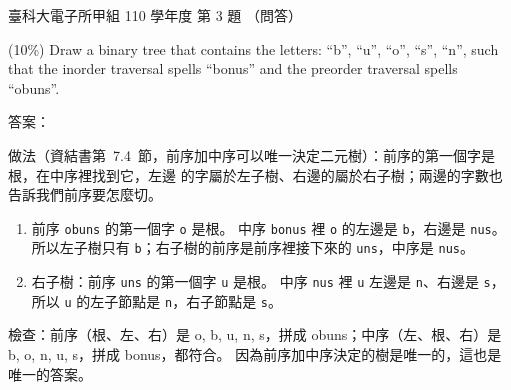 \begin{pastexam}[label={px:ntust-110-ete-ds-03}]{臺科大電子所甲組 110 學年度 第 3 題}
（問答）

(10\%) Draw a binary tree that contains the letters: ``b'', ``u'', ``o'', ``s'', ``n'', such that
the inorder traversal spells ``bonus'' and the preorder traversal spells ``obuns''.
\end{pastexam}

\begin{pastsoln}
答案：
\begin{center}
\end{center}

做法（資結書第~7.4~節，前序加中序可以唯一決定二元樹）：前序的第一個字是根，在中序裡找到它，左邊
的字屬於左子樹、右邊的屬於右子樹；兩邊的字數也告訴我們前序要怎麼切。
\begin{enumerate}
\item 前序 \texttt{obuns} 的第一個字 \texttt{o} 是根。 中序 \texttt{bonus} 裡 \texttt{o} 的左邊是
\texttt{b}，右邊是 \texttt{nus}。 所以左子樹只有 \texttt{b}；右子樹的前序是前序裡接下來的
\texttt{uns}，中序是 \texttt{nus}。
\item 右子樹：前序 \texttt{uns} 的第一個字 \texttt{u} 是根。 中序 \texttt{nus} 裡 \texttt{u} 左邊是
\texttt{n}、右邊是 \texttt{s}，所以 \texttt{u} 的左子節點是 \texttt{n}，右子節點是 \texttt{s}。
\end{enumerate}
檢查：前序（根、左、右）是 o, b, u, n, s，拼成 obuns；中序（左、根、右）是 b, o, n, u, s，拼成
bonus，都符合。 因為前序加中序決定的樹是唯一的，這也是唯一的答案。
\end{pastsoln}
